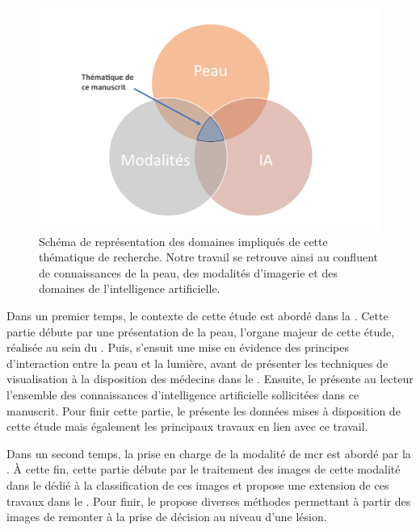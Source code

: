 \begin{figure}[H]
    \centering
    \includegraphics[width=0.8\linewidth]{contents/i_introduction/resources/scheme_our_work.pdf}
    \caption{Schéma de représentation des domaines impliqués de cette thématique de recherche. Notre travail se retrouve ainsi au confluent de connaissances de la peau, des modalités d'imagerie et des domaines de l'intelligence artificielle.}
    \label{fig:scheme_our_work}
\end{figure}\par

Dans un premier temps, le contexte de cette étude est abordé dans la . Cette partie débute par une présentation de la peau, l'organe majeur de cette étude, réalisée au sein du . Puis, s'ensuit une mise en évidence des principes d'interaction entre la peau et la lumière, avant de présenter les techniques de visualisation à la disposition des médecins dans le . Ensuite, le  présente au lecteur l'ensemble des connaissances d'intelligence artificielle sollicitées dans ce manuscrit. Pour finir cette partie, le  présente les données mises à disposition de cette étude mais également les principaux travaux en lien avec ce travail.\par

Dans un second temps, la prise en charge de la modalité de \gls{mcr} est abordé par la . À cette fin, cette partie débute par le traitement des images de cette modalité dans le  dédié à la classification de ces images et propose une extension de ces travaux dans le . Pour finir, le  propose diverses méthodes permettant à partir des images de remonter à la prise de décision au niveau d'une lésion.\par

